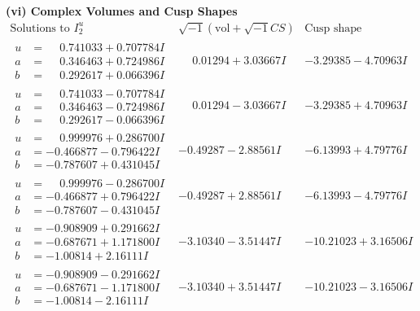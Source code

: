 \documentclass[1p]{elsarticle_modified}
\theoremstyle{definition}
\newcommand{\I}{\sqrt{-1}}
\begin{document}
\newpage\flushleft \textbf{(vi) Complex Volumes and Cusp Shapes}
$$\begin{array}{c|c|c}  
\text{Solutions to }I^u_{2}& \I (\text{vol} + \sqrt{-1}CS) & \text{Cusp shape}\\
 \hline 
\begin{aligned}
u &= \phantom{-}0.741033 + 0.707784 I \\
a &= \phantom{-}0.346463 + 0.724986 I \\
b &= \phantom{-}0.292617 + 0.066396 I\end{aligned}
 & \phantom{-}0.01294 + 3.03667 I & -3.29385 - 4.70963 I \\ \hline\begin{aligned}
u &= \phantom{-}0.741033 - 0.707784 I \\
a &= \phantom{-}0.346463 - 0.724986 I \\
b &= \phantom{-}0.292617 - 0.066396 I\end{aligned}
 & \phantom{-}0.01294 - 3.03667 I & -3.29385 + 4.70963 I \\ \hline\begin{aligned}
u &= \phantom{-}0.999976 + 0.286700 I \\
a &= -0.466877 - 0.796422 I \\
b &= -0.787607 + 0.431045 I\end{aligned}
 & -0.49287 - 2.88561 I & -6.13993 + 4.79776 I \\ \hline\begin{aligned}
u &= \phantom{-}0.999976 - 0.286700 I \\
a &= -0.466877 + 0.796422 I \\
b &= -0.787607 - 0.431045 I\end{aligned}
 & -0.49287 + 2.88561 I & -6.13993 - 4.79776 I \\ \hline\begin{aligned}
u &= -0.908909 + 0.291662 I \\
a &= -0.687671 + 1.171800 I \\
b &= -1.00814 + 2.16111 I\end{aligned}
 & -3.10340 - 3.51447 I & -10.21023 + 3.16506 I \\ \hline\begin{aligned}
u &= -0.908909 - 0.291662 I \\
a &= -0.687671 - 1.171800 I \\
b &= -1.00814 - 2.16111 I\end{aligned}
 & -3.10340 + 3.51447 I & -10.21023 - 3.16506 I \\ \hline\begin{aligned}

\end{aligned}
\end{array}$$
\end{document}
